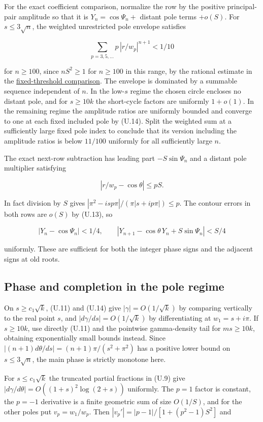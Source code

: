 \documentclass[11pt]{article}
\begin{document}
For the exact coefficient comparison, normalize the row by the positive principal-pair amplitude so that it is $Y_n=\cos\Psi_n+$ distant pole terms $+o(S)$. For $s\le3\sqrt n$, the weighted unrestricted pole envelope satisfies

\[
\sum_{p=3,5,\ldots}p\,|r/w_p|^{n+1}<1/10
\]

for $n\ge100$, since $nS^2\ge1$ for $n\ge100$ in this range, by the rational estimate in the \href{https://github.com/ProgramComputer/open-math-research/blob/main/topics/long-cycle-excedances/fixed-threshold.md}{fixed-threshold comparison}. The envelope is dominated by a summable sequence independent of $n$. In the low-$s$ regime the chosen circle encloses no distant pole, and for $s\ge10k$ the short-cycle factors are uniformly $1+o(1)$. In the remaining regime the amplitude ratios are uniformly bounded and converge to one at each fixed included pole by (U.14). Split the weighted sum at a sufficiently large fixed pole index to conclude that its version including the amplitude ratios is below $11/100$ uniformly for all sufficiently large $n$.

The exact next-row subtraction has leading part $-S\sin\Psi_n$ and a distant pole multiplier satisfying

\[
|r/w_p-\cos\theta|\le pS.
\]

In fact division by $S$ gives $|\pi^2-isp\pi|/(\pi|s+ip\pi|)\le p$. The contour errors in both rows are $o(S)$ by (U.13), so

\[
|Y_n-\cos\Psi_n|<1/4,\qquad
|Y_{n+1}-\cos\theta\,Y_n+S\sin\Psi_n|<S/4
\tag{U.15}
\]

uniformly. These are sufficient for both the integer phase signs and the adjacent signs at old roots.

\subsection{Phase and completion in the pole regime}

On $s\ge c_1\sqrt k$, (U.11) and (U.14) give $|\gamma|=O(1/\sqrt k)$ by comparing vertically to the real point $s$, and $|d\gamma/ds|=O(1/\sqrt k)$ by differentiating at $w_1=s+i\pi$. If $s\ge10k$, use directly (U.11) and the pointwise gamma-density tail for $ms\ge10k$, obtaining exponentially small bounds instead. Since $|(n+1)d\theta/ds|=(n+1)\pi/(s^2+\pi^2)$ has a positive lower bound on $s\le3\sqrt n$, the main phase is strictly monotone here.

For $s\le c_1\sqrt k$ the truncated partial fractions in (U.9) give $|d\gamma/d\theta|=O((1+s)^2\log(2+s))$ uniformly. The $p=1$ factor is constant, the $p=-1$ derivative is a finite geometric sum of size $O(1/S)$, and for the other poles put $v_p=w_1/w_p$. Then $|v_p'|=|p-1|/[1+(p^2-1)S^2]$ and
\end{document}
